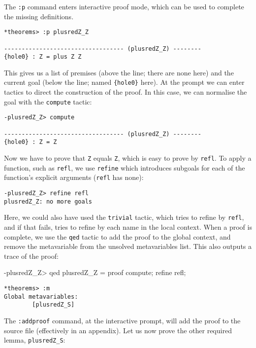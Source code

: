 \noindent
The \texttt{:p} command enters interactive proof mode, which can be used to complete the missing definitions.

\begin{lstlisting}[style=stdout]
*theorems> :p plusredZ_Z

---------------------------------- (plusredZ_Z) --------
{hole0} : Z = plus Z Z
\end{lstlisting}

\noindent
This gives us a list of premises (above the line; there are none here) and the current goal (below the line; named \texttt{\{hole0\}} here).
At the prompt we can enter tactics to direct the construction of the proof.
In this case, we can normalise the goal with the \texttt{compute} tactic:

\begin{lstlisting}[style=stdout]
-plusredZ_Z> compute

---------------------------------- (plusredZ_Z) --------
{hole0} : Z = Z
\end{lstlisting}

\noindent
Now we have to prove that \texttt{Z} equals \texttt{Z}, which is easy to prove by \texttt{refl}.
To apply a function, such as \texttt{refl}, we use \texttt{refine} which introduces subgoals for each of the function's explicit arguments (\texttt{refl} has none):

\begin{lstlisting}[style=stdout]
-plusredZ_Z> refine refl
plusredZ_Z: no more goals
\end{lstlisting}

\noindent
Here, we could also have used the \texttt{trivial} tactic, which tries to refine by \texttt{refl}, and if that fails, tries to refine by each name in the local context.
When a proof is complete, we use the \texttt{qed} tactic to add the proof to the global context, and remove the metavariable from the unsolved metavariables list.
This also outputs a trace of the proof:

\begin{code}
-plusredZ_Z> qed
plusredZ_Z = proof {
    compute;
    refine refl;
}
\end{code}

\begin{lstlisting}[style=stdout]
*theorems> :m 
Global metavariables:
        [plusredZ_S]
\end{lstlisting} 

\noindent
The \texttt{:addproof} command, at the interactive prompt, will add the proof to the source file (effectively in an appendix).
Let us now prove the other required lemma, \texttt{plusredZ\_S}:

